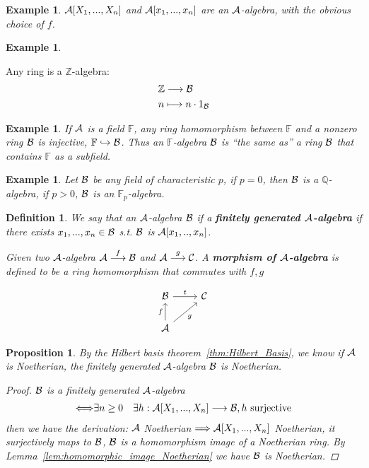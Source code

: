 \documentclass[11pt]{article}
\newtheorem{prop}[thm]{Proposition}
\newtheorem{dfn}[thm]{Definition}
\newtheorem{ex}[thm]{Example}
\newcommand{\intg}{\mathbb Z}
\newcommand{\bbf}{\mathbb F}
\newcommand{\ratl}{\mathbb Q}
\newcommand{\cala}{{\cal A}}
\newcommand{\calb}{{\cal B}}
\newcommand{\calc}{{\cal C}}
\newcommand{\Lrta}{\Longrightarrow}
\newcommand{\lrta}{\longrightarrow}
\newcommand{\Llrta}{\Longleftrightarrow}
\newcommand{\inj}{\hookrightarrow}
\begin{document}
\begin{ex}
$\cala[X_1,...,X_n]$ and $\cala[x_1,...,x_n]$ are an $\cala$-algebra, with the obvious choice of $f$.
\end{ex}
\begin{ex}

\end{ex}Any ring is a $\intg$-algebra:
$$
\begin{aligned}
&\intg \lrta \calb\\
&n\longmapsto n \cdot 1_\calb
\end{aligned}
$$
\begin{ex}
If $\cala$ is a field $\bbf$, any ring homomorphism between $\bbf$ and a nonzero ring $\calb$ is injective, $\bbf\inj \calb$. Thus an $\bbf$-algebra $\calb$ is ``the same as'' a ring $\calb$ that contains $\bbf$ as a subfield.
\end{ex}

\begin{ex}
Let $\calb$ be any field of characteristic $p$, if $p=0$, then $\calb$ is a $\ratl$-algebra, if $p>0$, $\calb$ is an $\bbf_p$-algebra.
\end{ex}

\begin{dfn}
We say that an $\cala$-algebra $\calb$ if a \textbf{finitely generated $\cala$-algebra} if there exists $x_1,...,x_n\in \calb$ s.t. $\calb$ is $\cala[x_1,..,x_n]$. 

Given two $\cala$-algebra $\cala\overset{f}{\lrta}\calb$ and $\cala\overset{g}{\lrta}\calc$. A \textbf{morphism of $\cala$-algebra} is defined to be a ring homomorphism that commutes with $f,g$

\[
\begin{tikzcd}
\calb\ar[r, "t"]&\calc\\
\cala \ar[u, "f"]\ar[ur,swap, "g"] 
\end{tikzcd}
\] 
\end{dfn}

\begin{prop}
By the Hilbert basis theorem~\ref{thm:Hilbert_Basis}, we know if $\cala$ is Noetherian, the finitely generated $\cala$-algebra $\calb$ is Noetherian.
\begin{proof}
$\calb$ is a finitely generated $\cala$-algebra\\
$$
\begin{aligned}
\Llrta &\exists n\geq 0
& \exists h:\cala[X_1,...,X_n]\lrta \calb, h\text{ surjective}
\end{aligned}
$$
then we have the derivation: $\cala$ Noetherian $\Lrta \cala[X_1,...,X_n]$ Noetherian, it surjectively maps to $\calb$, $\calb$ is a homomorphism image of a Noetherian ring. By Lemma~\ref{lem:homomorphic_image_Noetherian} we have $\calb$ is Noetherian.
\end{proof}
\end{prop}
\end{document}
